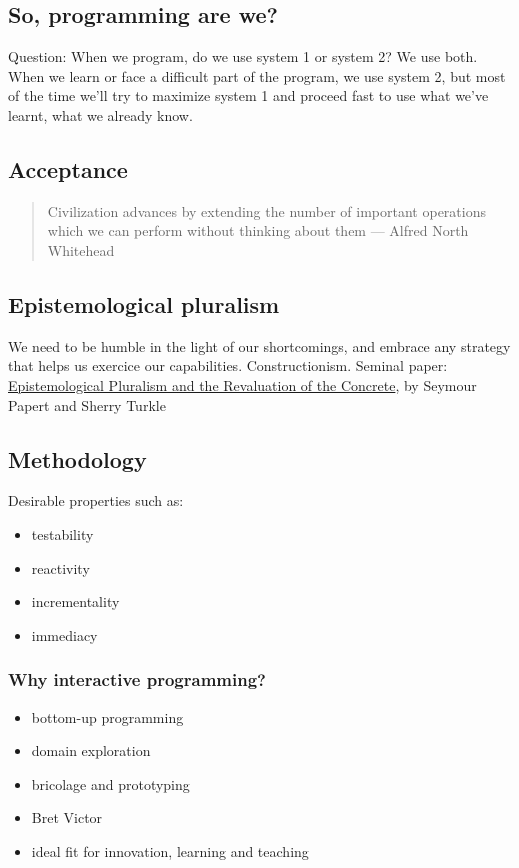 \documentclass[11pt]{article}
\begin{document}
\subsection*{So, programming are we?}
\label{sec:orgheadline5}
Question: When we program, do we use system 1 or system 2?
We use both. When we learn or face a difficult part of the program, we use system 2, but most of the time we’ll try to maximize system 1 and proceed fast to use what we’ve learnt, what we already know.
\subsection*{Acceptance}
\label{sec:orgheadline6}
\begin{quote}
Civilization advances by extending the number of important operations which we can perform without thinking about them — Alfred North Whitehead
\end{quote}
\subsection*{Epistemological pluralism}
\label{sec:orgheadline7}
We need to be humble in the light of our shortcomings, and embrace any strategy that helps us exercice our capabilities. 
Constructionism. Seminal paper: \href{http://www.papert.org/articles/EpistemologicalPluralism.html}{Epistemological Pluralism and the Revaluation of the Concrete}, by Seymour Papert and Sherry Turkle
\subsection*{Methodology}
\label{sec:orgheadline9}
Desirable properties such as:
\begin{itemize}
\item testability
\item reactivity
\item incrementality
\item immediacy
\end{itemize}
\subsubsection*{Why interactive programming?}
\label{sec:orgheadline8}
\begin{itemize}
\item bottom-up programming
\item domain exploration
\item bricolage and prototyping
\item Bret Victor
\item ideal fit for innovation, learning and teaching
\end{itemize}
\end{document}

